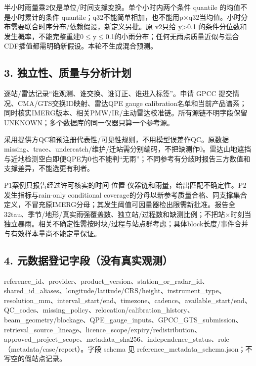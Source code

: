 \documentclass[UTF8,fontset=fandol,10pt]{ctexart}
\begin{document}
半小时雨量乘2仅是单位/\allowbreak{}时间支撑变换。单个小时内两个条件 quantile 的均值不是小时累计的条件 quantile；q32不能简单相加，也不能用p\(\times\)q32当均值。小时分布需要联合时序分布/\allowbreak{}依赖假设，新定义另批。原 v2只给 y>0.1 的条件分位数和发生概率，不能完整重建0\(\le\)y\(\le\)0.1的小雨分布；任何无雨点质量近似与混合CDF插值都需明确新假设。本轮不生成混合预测。

\subsection{3. 独立性、质量与分析计划}

逐站/\allowbreak{}雷达记录“谁观测、谁交换、谁订正、谁进入标签”。申请 GPCC 提交情况、CMA/\allowbreak{}GTS交换ID映射、雷达QPE gauge calibration名单和当前产品谱系；同时核实IMERG版本、相关PMW/\allowbreak{}IR/\allowbreak{}主动雷达校准链。所有源链不明字段保留UNKNOWN；多个数据库的同一仪器只算一个参考源。

采用提供方QC和预注册代表性/\allowbreak{}可见性规则，不用模型误差作QC。原数据missing、trace、undercatch/\allowbreak{}维护/\allowbreak{}迁站需分别编码，不把缺测作0。雷达山地遮挡与近地检测空白即便QPE为0也不能判“无雨”；不同参考有分歧时报告三方数值和支撑差异，不能选更有利者。

P1案例只报告经过许可核实的时间-位置-仪器链和雨量，给出匹配不确定性。P2发生指标与rain-only conditional coverage的分母以新参考质量合格、同支撑集合定义，不冒充原IMERG分母；其发生阈值可因量器检出限需新批准。报告全32tau、季节/\allowbreak{}地形/\allowbreak{}真实雨强覆盖数、独立站/\allowbreak{}过程数和缺测比例；不把站\(\times\)时刻当独立暴雨。相关不确定性需按时块/\allowbreak{}过程与站点群考虑；具体block长度/\allowbreak{}事件合并与有效样本量尚不能定量保证。

\subsection{4. 元数据登记字段（没有真实观测）}

reference\_\allowbreak{}id、provider、product\_\allowbreak{}version、station\_\allowbreak{}or\_\allowbreak{}radar\_\allowbreak{}id、shared\_\allowbreak{}id\_\allowbreak{}aliases、longitude/\allowbreak{}latitude/\allowbreak{}CRS/\allowbreak{}height、instrument\_\allowbreak{}type、resolution\_\allowbreak{}mm、interval\_\allowbreak{}start/\allowbreak{}end、timezone、cadence、available\_\allowbreak{}start/\allowbreak{}end、QC\_\allowbreak{}codes、missing\_\allowbreak{}policy、relocation/\allowbreak{}calibration\_\allowbreak{}history、beam\_\allowbreak{}geometry/\allowbreak{}blockage、QPE\_\allowbreak{}gauge\_\allowbreak{}inputs、GPCC\_\allowbreak{}GTS\_\allowbreak{}submission、retrieval\_\allowbreak{}source\_\allowbreak{}lineage、licence\_\allowbreak{}scope/\allowbreak{}expiry/\allowbreak{}redistribution、approved\_\allowbreak{}project\_\allowbreak{}scope、metadata\_\allowbreak{}sha256、independence\_\allowbreak{}status、role（metadata/\allowbreak{}case/\allowbreak{}report）。字段 schema 见 reference\_\allowbreak{}metadata\_\allowbreak{}schema.json；不写空的假站点记录。
\end{document}
